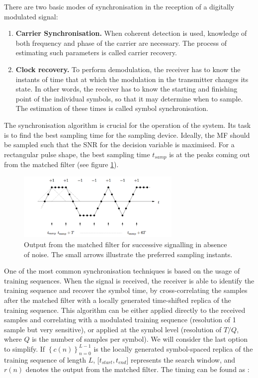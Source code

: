\documentclass[12pt,a4paper,openright]{report}
\begin{document}
There are two basic modes of synchronisation in the reception of a digitally modulated signal:
\begin{enumerate}
\item \textbf{Carrier Synchronisation.}  When coherent detection is used, knowledge of both  frequency and phase of the carrier are necessary. The process of estimating such parameters is called carrier recovery.

\item \textbf{Clock recovery.} To perform demodulation, the receiver has to know the instants of time that at which the modulation in the transmitter changes its state. In other words, the receiver has to know the starting and finishing point of the individual symbols, so that it may determine when to sample. The estimation of these times is called symbol synchronisation.
\end{enumerate}

The synchronisation algorithm is crucial for the operation of the system. Its task is to find the best sampling time for the sampling device. Ideally, the MF should be sampled such that the SNR for the decision variable is maximised. For a rectangular pulse shape, the best sampling time $t_{samp}$ is at the peaks coming out from the matched filter (see figure \ref{fig:mfpeaks}).

 \begin{figure}[H]
  \centering
    \includegraphics[width=0.7\textwidth]{mfpeaks.pdf}
    \caption[Output from the matched filter for successive signalling in absence of noise]{Output from the matched filter for successive signalling in absence of noise. The small arrows illustrate the preferred sampling instants\cite{ProjectEQ2310}.}
    \label{fig:mfpeaks}
\end{figure}

One of the most common synchronisation techniques is based on the usage of training sequences. When the signal is received, the receiver is able to identify the training sequence and recover the symbol time, by cross-correlating the samples after the matched filter with a locally generated time-shifted replica of the training sequence. This algorithm can be either applied directly to the received samples and correlating with a modulated training sequence (resolution of 1 sample but very sensitive), or applied at the symbol level (resolution of $T/Q$, where $Q$ is the number of samples per symbol). We will consider the last option to simplify. If ${\left\{ {c(n)} \right\}_{n = 0}^{L - 1}}$ is the locally generated symbol-spaced replica of the training sequence of length $L$, [$t_{start},t_{end}$] represents the search window, and $r(n)$ denotes the output from the matched filter. The timing can be found as \cite{HaykinBook}:
\end{document}
